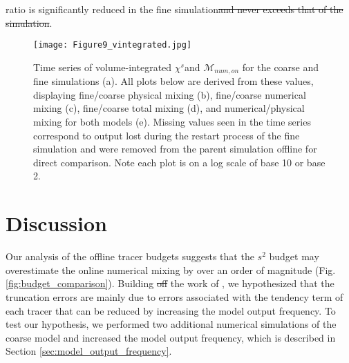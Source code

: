 \documentclass[draft]{agujournal2019}
\providecommand{\DIFadd}[1]{{\protect\color{blue}\uwave{#1}}} %
\providecommand{\DIFdel}[1]{{\protect\color{red}\sout{#1}}}                      %
\providecommand{\DIFaddbegin}{} %
\providecommand{\DIFaddend}{} %
\providecommand{\DIFdelbegin}{} %
\providecommand{\DIFdelend}{} %
\providecommand{\DIFaddFL}[1]{\DIFadd{#1}} %
\providecommand{\DIFaddbeginFL}{} %
\providecommand{\DIFaddendFL}{} %
\providecommand{\DIFdelbeginFL}{} %
\providecommand{\DIFdelendFL}{} %
\begin{document}
ratio is significantly reduced in the fine simulation\DIFdelbegin \DIFdel{and never exceeds that of the simulation}\DIFdelend . 

\begin{figure}[ht!]
 \DIFdelbeginFL %
\DIFdelendFL \DIFaddbeginFL \centerline{\texttt{[image: Figure9\_vintegrated.jpg]}}
  \DIFaddendFL \caption{Time series of volume-integrated $\chi^s$\DIFaddbeginFL \DIFaddFL{, $\chi_H^s$,  }\DIFaddendFL and $\mathcal{M}_{num, on}$ for the coarse and fine simulations (a). All plots below are derived from these values, displaying fine/coarse physical mixing (b), fine/coarse numerical mixing (c), fine/coarse total mixing (d), and numerical/physical mixing for both models (e). Missing values seen in the time series correspond to output lost during the restart process of the fine simulation and were removed from the parent simulation offline for direct comparison. Note each plot is on a log scale of base 10 or base 2.}
  \label{fig:volume-integrated}
\end{figure}

\section{Discussion} \label{sec:discussion}

Our analysis of the offline tracer budgets suggests that the $s^2$ budget may overestimate the online numerical mixing by over an order of magnitude (Fig. \ref{fig:budget_comparison}). Building \DIFdelbegin \DIFdel{off }\DIFdelend \DIFaddbegin \DIFadd{on }\DIFaddend the work of , we hypothesized that the truncation errors are mainly due to errors associated with the tendency term of each tracer that can be reduced by increasing the model output frequency. To test our hypothesis, we performed two additional numerical simulations of the coarse model and increased the model output frequency, which is described in Section \ref{sec:model_output_frequency}.
\end{document}
